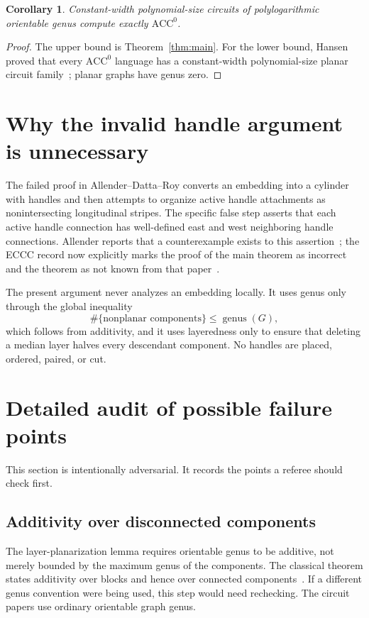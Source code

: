 \documentclass[11pt]{article}
\newtheorem{corollary}[theorem]{Corollary}
\theoremstyle{definition}
\newcommand{\ACC}{\mathrm{ACC}^{0}}
\newcommand{\genus}{\operatorname{genus}}
\begin{document}
\begin{corollary}
Constant-width polynomial-size circuits of polylogarithmic orientable genus compute exactly $\ACC$.
\end{corollary}

\begin{proof}
The upper bound is Theorem~\ref{thm:main}. For the lower bound, Hansen proved that every $\ACC$ language has a constant-width polynomial-size planar circuit family~\cite{Hansen2006}; planar graphs have genus zero.
\end{proof}

\section{Why the invalid handle argument is unnecessary}

The failed proof in Allender--Datta--Roy converts an embedding into a cylinder with handles and then attempts to organize active handle attachments as nonintersecting longitudinal stripes. The specific false step asserts that each active handle connection has well-defined east and west neighboring handle connections. Allender reports that a counterexample exists to this assertion~\cite{Allender2023}; the ECCC record now explicitly marks the proof of the main theorem as incorrect and the theorem as not known from that paper~\cite{ECCCComment2025}.

The present argument never analyzes an embedding locally. It uses genus only through the global inequality
\[
  \#\{\text{nonplanar components}\}\le \genus(G),
\]
which follows from additivity, and it uses layeredness only to ensure that deleting a median layer halves every descendant component. No handles are placed, ordered, paired, or cut.

\section{Detailed audit of possible failure points}

This section is intentionally adversarial. It records the points a referee should check first.

\subsection{Additivity over disconnected components}
The layer-planarization lemma requires orientable genus to be additive, not merely bounded by the maximum genus of the components. The classical theorem states additivity over blocks and hence over connected components~\cite{BHKY1962}. If a different genus convention were being used, this step would need rechecking. The circuit papers use ordinary orientable graph genus.
\end{document}
